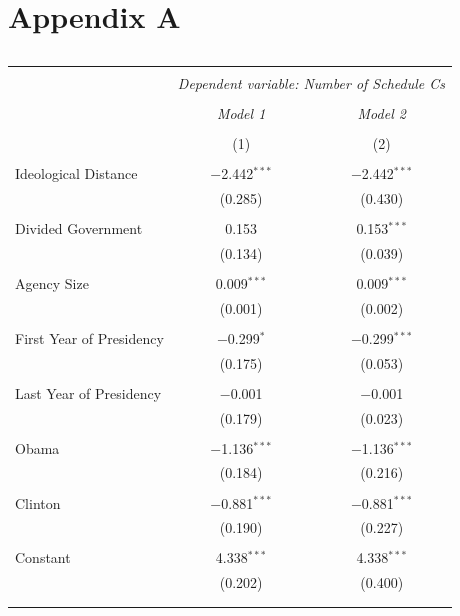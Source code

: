 \documentclass[12pt]{article}
\begin{document}
\section*{Appendix A}
\begin{table}[!htbp] \centering 
  \caption{} 
  \label{} 
\begin{tabular}{@{\extracolsep{5pt}}lcc} 
\\[-1.8ex]\hline 
\hline \\[-1.8ex] 
 & \multicolumn{2}{c}{\textit{Dependent variable: Number of Schedule Cs}} \\ 
\cline{2-3} 
\\[-1.8ex] & \textit{Model 1} & \textit{Model 2} \\ 
\\[-1.8ex] & (1) & (2)\\ 
\hline \\[-1.8ex] 
 Ideological Distance & $-$2.442$^{***}$ & $-$2.442$^{***}$ \\ 
  & (0.285) & (0.430) \\ 
  & & \\ 
 Divided Government & 0.153 & 0.153$^{***}$ \\ 
  & (0.134) & (0.039) \\ 
  & & \\ 
 Agency Size & 0.009$^{***}$ & 0.009$^{***}$ \\ 
  & (0.001) & (0.002) \\ 
  & & \\ 
 First Year of Presidency & $-$0.299$^{*}$ & $-$0.299$^{***}$ \\ 
  & (0.175) & (0.053) \\ 
  & & \\ 
 Last Year of Presidency & $-$0.001 & $-$0.001 \\ 
  & (0.179) & (0.023) \\ 
  & & \\ 
 Obama & $-$1.136$^{***}$ & $-$1.136$^{***}$ \\ 
  & (0.184) & (0.216) \\ 
  & & \\ 
 Clinton & $-$0.881$^{***}$ & $-$0.881$^{***}$ \\ 
  & (0.190) & (0.227) \\ 
  & & \\ 
 Constant & 4.338$^{***}$ & 4.338$^{***}$ \\ 
  & (0.202) & (0.400) \\ 
  & & \\ 
\hline \\[-1.8ex] 

\end{tabular}
\end{table}
\end{document}
